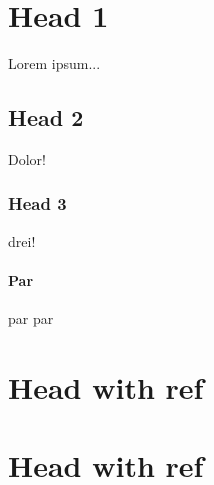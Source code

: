 \section{Head 1}
Lorem ipsum...

\subsection{Head 2}
Dolor!

\subsubsection{Head 3}
drei!

\paragraph{Par}
par par

\section{Head with ref \label{refname1}}
\section{Head with ref \label{refname2}}
